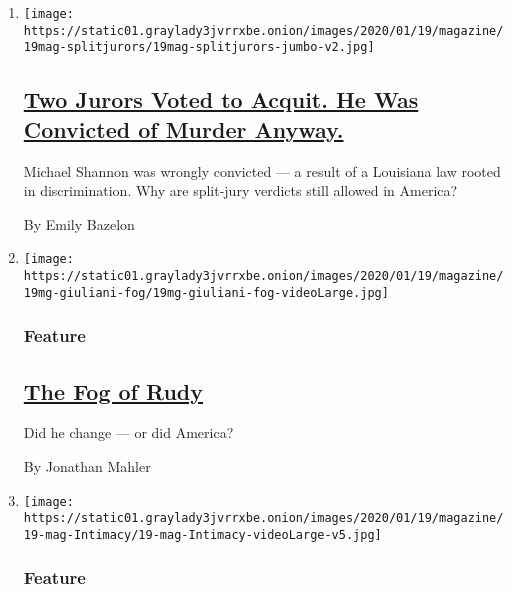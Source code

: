 \begin{enumerate}
\def\labelenumi{\arabic{enumi}.}
\item
  \texttt{[image: https://static01.graylady3jvrrxbe.onion/images/2020/01/19/magazine/19mag-splitjurors/19mag-splitjurors-jumbo-v2.jpg]}

  \hypertarget{two-jurors-voted-to-acquit-he-was-convicted-of-murder-anyway}{%
  \subsection{\texorpdfstring{\href{/interactive/2020/01/15/magazine/split-jurors.html}{Two
  Jurors Voted to Acquit. He Was Convicted of Murder
  Anyway.}}{Two Jurors Voted to Acquit. He Was Convicted of Murder Anyway.}}\label{two-jurors-voted-to-acquit-he-was-convicted-of-murder-anyway}}

  Michael Shannon was wrongly convicted --- a result of a Louisiana law
  rooted in discrimination. Why are split-jury verdicts still allowed in
  America?

  By Emily Bazelon
\item
  \texttt{[image: https://static01.graylady3jvrrxbe.onion/images/2020/01/19/magazine/19mg-giuliani-fog/19mg-giuliani-fog-videoLarge.jpg]}

  \hypertarget{feature}{%
  \subsubsection{Feature}\label{feature}}

  \hypertarget{the-fog-of-rudy}{%
  \subsection{\texorpdfstring{\href{/interactive/2020/01/15/magazine/rudy-giuliani.html}{The
  Fog of Rudy}}{The Fog of Rudy}}\label{the-fog-of-rudy}}

  Did he change --- or did America?

  By Jonathan Mahler
\item
  \texttt{[image: https://static01.graylady3jvrrxbe.onion/images/2020/01/19/magazine/19-mag-Intimacy/19-mag-Intimacy-videoLarge-v5.jpg]}

  \hypertarget{feature-1}{%
  \subsubsection{Feature}\label{feature-1}}

  \hypertarget{the-sex-scene-evolves-for-the-metoo-era}{%
}
\end{enumerate}
